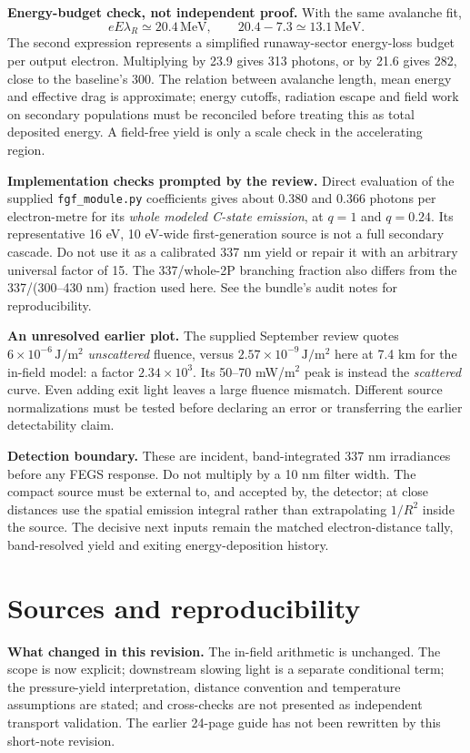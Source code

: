 \documentclass[11pt,a4paper]{article}
\newcommand{\xu}[1]{~\cite[#1]{Xu2015}}
\begin{document}
\textbf{Energy-budget check, not independent proof.} With the same avalanche fit,
\[
eE\lambda_R\simeq20.4\,\mathrm{MeV},\qquad
20.4-7.3\simeq13.1\,\mathrm{MeV}.
\]
The second expression represents a simplified runaway-sector energy-loss budget per output electron. Multiplying by 23.9 gives 313 photons, or by 21.6 gives 282, close to the baseline's 300. The relation between avalanche length, mean energy and effective drag is approximate; energy cutoffs, radiation escape and field work on secondary populations must be reconciled before treating this as total deposited energy. A field-free yield is only a scale check in the accelerating region.~\cite[Secs.~3.1 and 6]{Dwyer2011}\xu{Sec.~4.1}

\textbf{Implementation checks prompted by the review.} Direct evaluation of the supplied \texttt{fgf\_module.py} coefficients gives about 0.380 and 0.366 photons per electron-metre for its \emph{whole modeled C-state emission}, at $q=1$ and $q=0.24$. Its representative 16 eV, 10 eV-wide first-generation source is not a full secondary cascade. Do not use it as a calibrated 337 nm yield or repair it with an arbitrary universal factor of 15. The 337/whole-2P branching fraction also differs from the 337/(300--430 nm) fraction used here. See the bundle's audit notes for reproducibility.

\textbf{An unresolved earlier plot.} The supplied September review quotes $6\times10^{-6}\,\mathrm{J/m^2}$ \emph{unscattered} fluence, versus $2.57\times10^{-9}\,\mathrm{J/m^2}$ here at 7.4 km for the in-field model: a factor $2.34\times10^3$. Its 50--70 mW/m$^2$ peak is instead the \emph{scattered} curve. Even adding exit light leaves a large fluence mismatch. Different source normalizations must be tested before declaring an error or transferring the earlier detectability claim.

\textbf{Detection boundary.} These are incident, band-integrated 337 nm irradiances before any FEGS response. Do not multiply by a 10 nm filter width. The compact source must be external to, and accepted by, the detector; at close distances use the spatial emission integral rather than extrapolating $1/R^2$ inside the source. The decisive next inputs remain the matched electron-distance tally, band-resolved yield and exiting energy-deposition history.

\clearpage
\section*{Sources and reproducibility}
\textbf{What changed in this revision.} The in-field arithmetic is unchanged. The scope is now explicit; downstream slowing light is a separate conditional term; the pressure-yield interpretation, distance convention and temperature assumptions are stated; and cross-checks are not presented as independent transport validation. The earlier 24-page guide has not been rewritten by this short-note revision.
\end{document}
